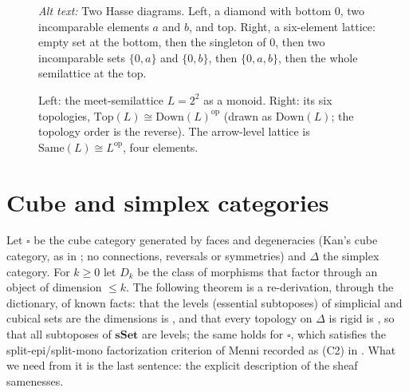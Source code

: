 \documentclass[11pt]{amsart}
\theoremstyle{definition}
\newcommand{\Same}{\mathrm{Same}}
\newcommand{\Top}{\mathrm{Top}}
\newcommand{\Down}{\mathrm{Down}}
\newcommand{\sset}{\mathbf{sSet}}
\newcommand{\cube}{\square}
\begin{document}
\begin{figure}[ht]
\centering
{}
\qquad\qquad
{}
\caption{Left: the meet-semilattice $L=2^2$ as a monoid. Right: its six
topologies, $\Top(L)\cong\Down(L)^{\mathrm{op}}$ (drawn as $\Down(L)$; the
topology order is the reverse). The arrow-level lattice is $\Same(L)\cong
L^{\mathrm{op}}$, four elements.}
\label{fig:semilattice}
\par\smallskip\noindent\textit{Alt text:} Two Hasse diagrams. Left, a diamond
with bottom $0$, two incomparable elements $a$ and $b$, and top. Right, a
six-element lattice: empty set at the bottom, then the singleton of $0$, then
two incomparable sets $\{0,a\}$ and $\{0,b\}$, then $\{0,a,b\}$, then the whole
semilattice at the top.
\end{figure}

\section{Cube and simplex categories}\label{sec:cube}

Let $\cube$ be the cube category generated by faces and degeneracies (Kan's
cube category, as in \cite{KRRZ}; no connections, reversals or symmetries)
and $\Delta$ the simplex category. For $k\ge0$ let $D_k$ be the class of
morphisms that factor through an object of dimension $\le k$. The following
theorem is a re-derivation, through the dictionary, of known facts: that the
levels (essential subtoposes) of simplicial and cubical sets are the
dimensions is \cite[\S1]{KRRZ}, and that every topology on $\Delta$ is rigid
is \cite[Thm.~2.6]{Marques25}, so that all subtoposes of $\sset$ are levels;
the same holds for $\cube$, which satisfies the split-epi/split-mono
factorization criterion of Menni recorded as (C2) in \cite{Marques25}. What we need from it is
the last sentence: the explicit description of the sheaf samenesses.
\end{document}
